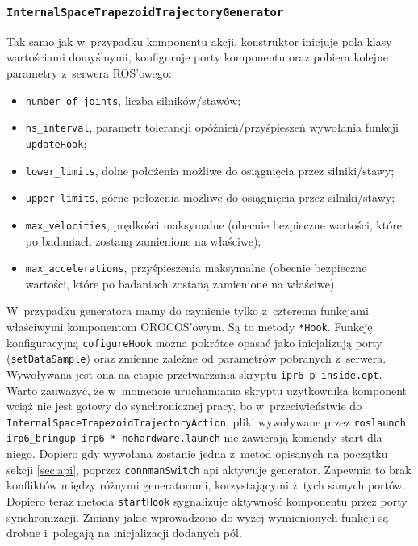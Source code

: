 \documentclass[a4paper, 12pt]{article}
\begin{document}
	\subsubsection{\texttt{InternalSpaceTrapezoidTrajectoryGenerator}}
	Tak samo jak w~przypadku komponentu akcji, konstruktor inicjuje pola klasy wartościami domyślnymi, konfiguruje porty komponentu oraz pobiera kolejne parametry z~serwera ROS'owego:
	\begin{itemize}
	\item \texttt{number\_of\_joints}, liczba silników/stawów;
	\item \texttt{ns\_interval}, parametr tolerancji opóźnień/przyśpieszeń wywołania funkcji \texttt{updateHook};
	\item \texttt{lower\_limits}, dolne położenia możliwe do osiągnięcia przez silniki/stawy;
	\item \texttt{upper\_limits}, górne położenia możliwe do osiągnięcia przez silniki/stawy;
	\item \texttt{max\_velocities}, prędkości maksymalne (obecnie bezpieczne wartości, które po badaniach zostaną zamienione na właściwe);
	\item \texttt{max\_accelerations}, przyśpieszenia maksymalne (obecnie bezpieczne wartości, które po badaniach zostaną zamienione na właściwe).
	\end{itemize}
	\par W~przypadku generatora mamy do czynienie tylko z~czterema funkcjami właściwymi komponentom OROCOS'owym. Są to metody \texttt{*Hook}. Funkcję konfiguracyjną \texttt{cofigureHook} można pokrótce opasać jako inicjalizują porty (\texttt{setDataSample}) oraz zmienne zależne od parametrów pobranych z~serwera. Wywoływana jest ona na etapie przetwarzania skryptu \linebreak\texttt{ipr6-p-inside.opt}. Warto zauważyć, że w~momencie uruchamiania skryptu użytkownika komponent wciąż nie jest gotowy do synchronicznej pracy, bo w~przeciwieństwie do \linebreak\texttt{InternalSpaceTrapezoidTrajectoryAction}, pliki wywoływane przez \texttt{roslaunch \linebreak irp6\_bringup irp6-*-nohardware.launch} nie zawierają komendy start dla niego. Dopiero gdy wywołana zostanie jedna z~metod opisanych na początku sekcji \ref{sec:api}, poprzez \texttt{connmanSwitch} api aktywuje generator. Zapewnia to brak konfliktów między różnymi generatorami, korzystającymi z~tych samych portów. Dopiero teraz metoda \texttt{startHook} sygnalizuje aktywność komponentu przez porty synchronizacji. Zmiany jakie wprowadzono do wyżej wymienionych funkcji są drobne i~polegają na inicjalizacji dodanych pól. 
\end{document}
